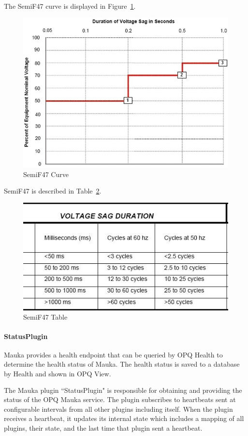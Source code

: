 The SemiF47 curve is displayed in Figure~\ref{fig:SemiF47Curve}.

\begin{figure}
	\centering
	\includegraphics[width=0.6\linewidth]{figures/semif47.jpg}
	\caption{SemiF47 Curve}
	\label{fig:SemiF47Curve}
\end{figure}

SemiF47 is described in Table~\ref{fig:SemiF47Table}.

\begin{figure}
	\centering
	\includegraphics[width=0.6\linewidth]{figures/semif47_table.jpg}
	\caption{SemiF47 Table}
	\label{fig:SemiF47Table}
\end{figure}


\paragraph{StatusPlugin}
Mauka provides a health endpoint that can be queried by OPQ Health to determine the health status of Mauka. The health status is saved to a database by Health and shown in OPQ View.

The Mauka plugin ``StatusPlugin" is responsible for obtaining and providing the status of the OPQ Mauka service. The plugin subscribes to heartbeats sent at configurable intervals from all other plugins including itself. When the plugin receives a heartbeat, it updates its internal state which includes a mapping of all plugins, their state, and the last time that plugin sent a heartbeat.

